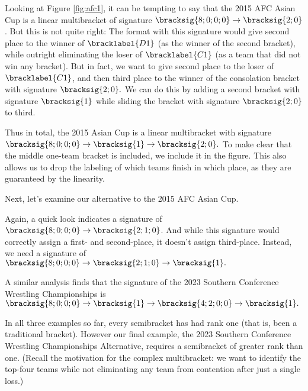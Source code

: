 {    

    Looking at Figure \ref{fig:afc1}, it can be tempting to say that the 2015 AFC Asian Cup is a linear multibracket of signature $\bracksig{8;0;0;0} \to \bracksig{2;0}$. But this is not quite right: The format with this signature would give second place to the winner of $\bracklabel{D1}$ (as the winner of the second bracket), while outright eliminating the loser of $\bracklabel{C1}$ (as a team that did not win any bracket). But in fact, we want to give second place to the loser of $\bracklabel{C1}$, and then third place to the winner of the consolation bracket with signature $\bracksig{2;0}.$ We can do this by adding a second bracket with signature $\bracksig{1}$ while sliding the bracket with signature $\bracksig{2;0}$ to third.

    Thus in total, the 2015 Asian Cup is a linear multibracket with signature $\bracksig{8;0;0;0} \to \bracksig{1} \to \bracksig{2;0}.$ To make clear that the middle one-team bracket is included, we include it in the figure. This also allows us to drop the labeling of which teams finish in which place, as they are guaranteed by the linearity.


    Next, let's examine our alternative to the 2015 AFC Asian Cup.


    Again, a quick look indicates a signature of $\bracksig{8;0;0;0} \to \bracksig{2;1;0}$. And while this signature would correctly assign a first- and second-place, it doesn't assign third-place. Instead, we need a signature of $\bracksig{8;0;0;0} \to \bracksig{2;1;0} \to \bracksig{1}.$


    A similar analysis finds that the signature of the 2023 Southern Conference Wrestling Championships \cite{wiki_socon} is $\bracksig{8;0;0;0} \to \bracksig{1} \to \bracksig{4;2;0;0} \to \bracksig{1}.$


    In all three examples so far, every semibracket has had rank one (that is, been a traditional bracket). However our final example, the 2023 Southern Conference Wrestling Championships Alternative, requires a semibracket of greater rank than one. (Recall the motivation for the complex multibracket: we want to identify the top-four teams while not eliminating any team from contention after just a single loss.)

}
